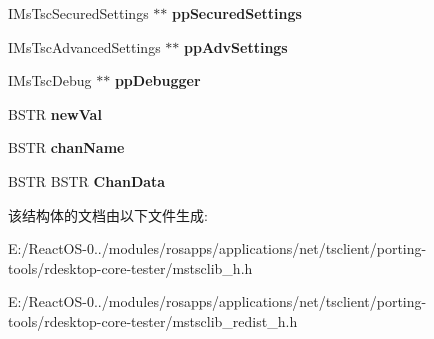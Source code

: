 \begin{DoxyCompactItemize}
\mbox{\label{struct_i_ms_tsc_ax_vtbl_a6788e04760cee5b709274b42a23bc7c8}} 
I\+Ms\+Tsc\+Secured\+Settings $\ast$$\ast$ {\bfseries pp\+Secured\+Settings}
\item 
\mbox{\label{struct_i_ms_tsc_ax_vtbl_acaaad5b60826bd88cec257b61592eb8d}} 
I\+Ms\+Tsc\+Advanced\+Settings $\ast$$\ast$ {\bfseries pp\+Adv\+Settings}
\item 
\mbox{\label{struct_i_ms_tsc_ax_vtbl_a8a279385f6831e3f234982a43f49bb9a}} 
I\+Ms\+Tsc\+Debug $\ast$$\ast$ {\bfseries pp\+Debugger}
\item 
\mbox{\label{struct_i_ms_tsc_ax_vtbl_a80fee6769e7cf5f9ff2a6a8f07c2abbe}} 
B\+S\+TR {\bfseries new\+Val}
\item 
\mbox{\label{struct_i_ms_tsc_ax_vtbl_ab48b287bd7c37cb53873c49828c8adc9}} 
B\+S\+TR {\bfseries chan\+Name}
\item 
\mbox{\label{struct_i_ms_tsc_ax_vtbl_a6cd5535a94408a12a58311de072c0dd0}} 
B\+S\+TR B\+S\+TR {\bfseries Chan\+Data}
\end{DoxyCompactItemize}


该结构体的文档由以下文件生成\+:\begin{DoxyCompactItemize}
\item 
E\+:/\+React\+O\+S-\/0../modules/rosapps/applications/net/tsclient/porting-\/tools/rdesktop-\/core-\/tester/mstsclib\+\_\+h.\+h\item 
E\+:/\+React\+O\+S-\/0../modules/rosapps/applications/net/tsclient/porting-\/tools/rdesktop-\/core-\/tester/mstsclib\+\_\+redist\+\_\+h.\+h\end{DoxyCompactItemize}
